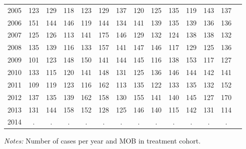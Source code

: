 \begin{table}[H]
\begin{threeparttable}
{\begin{tabular}{l*{13}{c}}
2005        &         123&         129&         118&         123&         129&         137&         120&         125&         135&         119&         143&         137\\
2006        &         151&         144&         146&         119&         144&         134&         141&         139&         135&         139&         136&         136\\
2007        &         125&         126&         113&         141&         175&         146&         129&         132&         124&         138&         138&         132\\
2008        &         135&         139&         116&         133&         157&         141&         147&         146&         117&         129&         125&         136\\
2009        &         101&         123&         148&         150&         141&         144&         145&         116&         138&         153&         117&         127\\
2010        &         133&         115&         120&         141&         148&         131&         125&         136&         146&         144&         142&         141\\
2011        &         109&         119&         123&         116&         162&         113&         135&         122&         133&         135&         132&         152\\
2012        &         137&         135&         139&         162&         158&         130&         155&         141&         140&         145&         127&         170\\
2013        &         131&         144&         158&         152&         128&         125&         146&         140&         115&         142&         131&         114\\
2014        &           .&           .&           .&           .&           .&           .&           .&           .&           .&           .&           .&           .\\
 \bottomrule \end{tabular} } \begin{tablenotes} \item \scriptsize \emph{Notes:} Number of cases per year and MOB in treatment cohort. \end{tablenotes} \end{threeparttable} \end{table} 
